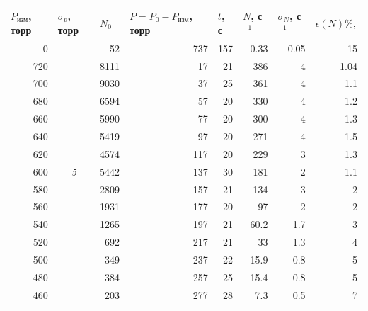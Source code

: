 \documentclass{article}
\begin{document}
\begin{table}[h!]
\centering
\begin{tabular}{|r|c|r|r|r|r|r|r|}
\hline
\multicolumn{1}{|l|}{$P_\text{изм}$, торр} &
  \multicolumn{1}{l|}{$\sigma_p$, торр} &
  \multicolumn{1}{l|}{$N_0$} &
  \multicolumn{1}{l|}{$P = P_0 - P_\text{изм}$, торр} &
  \multicolumn{1}{l|}{$t$, с} &
  \multicolumn{1}{l|}{$N$, с$^{-1}$} &
  \multicolumn{1}{l|}{$\sigma_{N}$, с$^{-1}$} &
  \multicolumn{1}{l|}{$\epsilon(N) \%,$} \\ \hline
0   & \multirow{20}{*}{\textit{5}} & 52   & 737 & 157 & 0.33 & 0.05 & 15   \\ \cline{1-1} \cline{3-8} 
720 &                              & 8111 & 17  & 21  & 386  & 4    & 1.04 \\ \cline{1-1} \cline{3-8} 
700 &                              & 9030 & 37  & 25  & 361  & 4    & 1.1  \\ \cline{1-1} \cline{3-8} 
680 &                              & 6594 & 57  & 20  & 330  & 4    & 1.2  \\ \cline{1-1} \cline{3-8} 
660 &                              & 5990 & 77  & 20  & 300  & 4    & 1.3  \\ \cline{1-1} \cline{3-8} 
640 &                              & 5419 & 97  & 20  & 271  & 4    & 1.5  \\ \cline{1-1} \cline{3-8} 
620 &                              & 4574 & 117 & 20  & 229  & 3    & 1.3  \\ \cline{1-1} \cline{3-8} 
600 &                              & 5442 & 137 & 30  & 181  & 2    & 1.1  \\ \cline{1-1} \cline{3-8} 
580 &                              & 2809 & 157 & 21  & 134  & 3    & 2    \\ \cline{1-1} \cline{3-8} 
560 &                              & 1931 & 177 & 20  & 97   & 2    & 2    \\ \cline{1-1} \cline{3-8} 
540 &                              & 1265 & 197 & 21  & 60.2 & 1.7  & 3    \\ \cline{1-1} \cline{3-8} 
520 &                              & 692  & 217 & 21  & 33   & 1.3  & 4    \\ \cline{1-1} \cline{3-8} 
500 &                              & 349  & 237 & 22  & 15.9 & 0.8  & 5    \\ \cline{1-1} \cline{3-8} 
480 &                              & 384  & 257 & 25  & 15.4 & 0.8  & 5    \\ \cline{1-1} \cline{3-8} 
460 &                              & 203  & 277 & 28  & 7.3  & 0.5  & 7    \\ \cline{1-1} \cline{3-8} 

\end{tabular}
\end{table}
\end{document}
